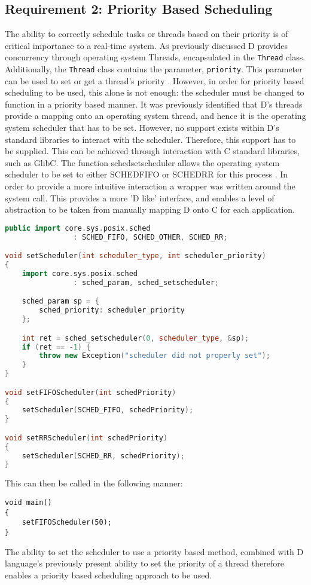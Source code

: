 \subsection{Requirement 2: Priority Based Scheduling}
The ability to correctly schedule tasks or threads based on their priority is of 
critical importance to a real-time system. As previously discussed D provides 
concurrency through operating system Threads, encapsulated in the
\texttt{Thread} class. Additionally, the \texttt{Thread} class contains the 
parameter, \texttt{priority}. This parameter can be used to set or get a thread's 
priority \cite{core-thread}. 
However, in order for priority based scheduling to be used, this alone is not 
enough: the scheduler must be changed to function in a priority based manner. 
It was previously identified that D's threads provide a mapping onto an operating  
system thread, and hence it is the operating system scheduler that has to be set.  
However, no support exists within D's standard libraries to interact with the
scheduler. 
Therefore, this support has to be supplied. 
This can be achieved through interaction with C standard libraries, such as GlibC. 
The function sched\textunderscore{}setscheduler allows the operating system 
scheduler to be set to either SCHED\textunderscore{}FIFO or SCHED\textunderscore{}RR for 
this process \cite{sched-setscheduler}. 
In order to provide a more intuitive interaction a wrapper was written around the 
system call. This provides a more 'D like' interface, and enables a level of
abstraction to be taken from manually mapping D onto C for each application. 
\begin{lstlisting}[language=C++]
public import core.sys.posix.sched 
                : SCHED_FIFO, SCHED_OTHER, SCHED_RR; 

void setScheduler(int scheduler_type, int scheduler_priority)
{
    import core.sys.posix.sched 
                : sched_param, sched_setscheduler; 

    sched_param sp = { 
        sched_priority: scheduler_priority 
    }; 

    int ret = sched_setscheduler(0, scheduler_type, &sp); 
    if (ret == -1) {
        throw new Exception("scheduler did not properly set");
    }
}

void setFIFOScheduler(int schedPriority)
{
    setScheduler(SCHED_FIFO, schedPriority);
}

void setRRScheduler(int schedPriority)
{
    setScheduler(SCHED_RR, schedPriority); 
}
\end{lstlisting}
This can then be called in the following manner: 
\begin{lstlisting}
void main()
{
    setFIFOScheduler(50); 
}
\end{lstlisting}
The ability to set the scheduler to use a priority based method, combined with 
D language's previously present ability to set the priority of a thread therefore 
enables a priority based scheduling approach to be used.  

